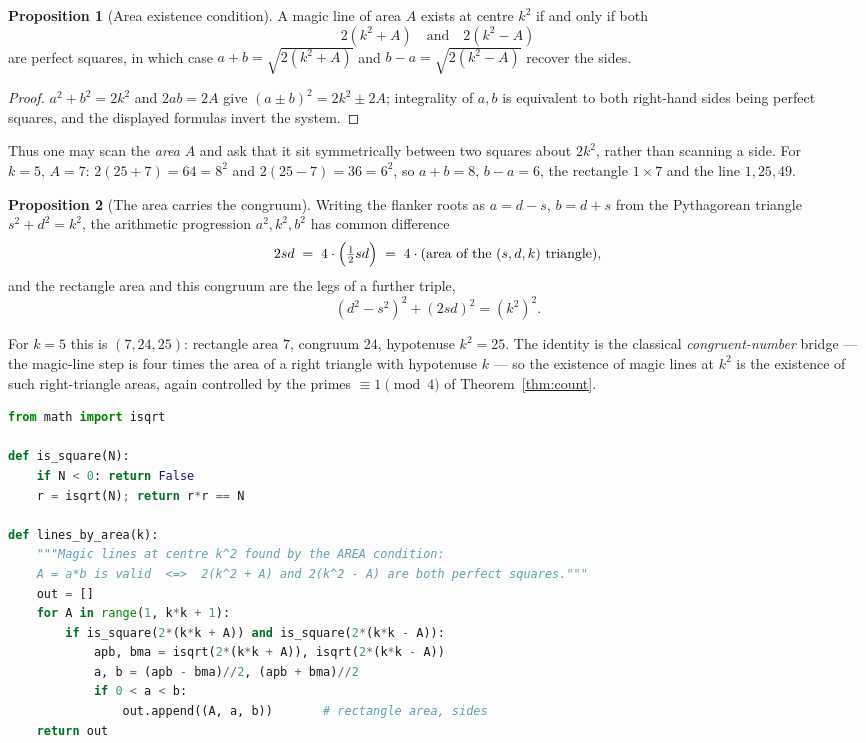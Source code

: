 \documentclass[11pt]{article}
\theoremstyle{definition}
\newtheorem{proposition}{Proposition}
\begin{document}
\begin{proposition}[Area existence condition]\label{prop:area}
A magic line of area $A$ exists at centre $k^{2}$ if and only if both
\[
  2(k^{2}+A)\quad\text{and}\quad 2(k^{2}-A)
\]
are perfect squares, in which case $a+b=\sqrt{2(k^{2}+A)}$ and
$b-a=\sqrt{2(k^{2}-A)}$ recover the sides.
\end{proposition}

\begin{proof}
$a^{2}+b^{2}=2k^{2}$ and $2ab=2A$ give $(a\pm b)^{2}=2k^{2}\pm2A$; integrality of
$a,b$ is equivalent to both right-hand sides being perfect squares, and the
displayed formulas invert the system.
\end{proof}

\noindent Thus one may scan the \emph{area} $A$ and ask that it sit symmetrically
between two squares about $2k^{2}$, rather than scanning a side. For $k=5,\,A=7$:
$2(25+7)=64=8^{2}$ and $2(25-7)=36=6^{2}$, so $a+b=8,\,b-a=6$, the rectangle
$1\times7$ and the line $1,25,49$.

\begin{proposition}[The area carries the congruum]\label{prop:congruum}
Writing the flanker roots as $a=d-s$, $b=d+s$ from the Pythagorean triangle
$s^{2}+d^{2}=k^{2}$, the arithmetic progression $a^{2},k^{2},b^{2}$ has common
difference
\[
  2sd \;=\; 4\cdot\Bigl(\tfrac{1}{2}sd\Bigr)
      \;=\; 4\cdot(\text{area of the }(s,d,k)\text{ triangle}),
\]
and the rectangle area and this congruum are the legs of a further triple,
\[
  (d^{2}-s^{2})^{2}+(2sd)^{2}=(k^{2})^{2}.
\]
\end{proposition}

\noindent For $k=5$ this is $(7,24,25)$: rectangle area $7$, congruum $24$,
hypotenuse $k^{2}=25$. The identity is the classical \emph{congruent-number}
bridge --- the magic-line step is four times the area of a right triangle with
hypotenuse $k$ --- so the existence of magic lines at $k^{2}$ is the existence of
such right-triangle areas, again controlled by the primes $\equiv1\pmod4$ of
Theorem~\ref{thm:count}.

\begin{lstlisting}[language=Python]
from math import isqrt

def is_square(N):
    if N < 0: return False
    r = isqrt(N); return r*r == N

def lines_by_area(k):
    """Magic lines at centre k^2 found by the AREA condition:
    A = a*b is valid  <=>  2(k^2 + A) and 2(k^2 - A) are both perfect squares."""
    out = []
    for A in range(1, k*k + 1):
        if is_square(2*(k*k + A)) and is_square(2*(k*k - A)):
            apb, bma = isqrt(2*(k*k + A)), isqrt(2*(k*k - A))
            a, b = (apb - bma)//2, (apb + bma)//2
            if 0 < a < b:
                out.append((A, a, b))       # rectangle area, sides
    return out
\end{lstlisting}
\end{document}
